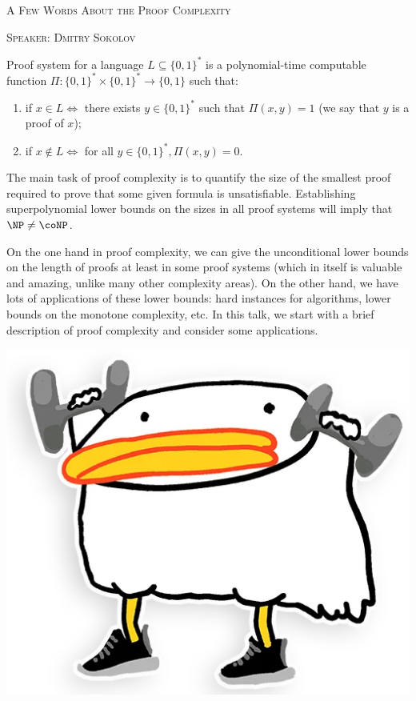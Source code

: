 \begin{center}
    \textsc{A Few Words About the Proof Complexity}

    \textsc{Speaker: Dmitry Sokolov}
\end{center}

Proof system for a language $L \subseteq \{0, 1\}^*$ is a polynomial-time computable function
$\Pi\colon \{0, 1\}^* \times \{0, 1\}^* \rightarrow \{0, 1\}$ such that: 
\begin{enumerate}
	\item if $x \in L \Leftrightarrow$ there exists $y \in \{0, 1\}^*$ such that $\Pi(x, y) = 1$ (we say
        that $y$ is a proof of $x$);
	\item if $x \notin L \Leftrightarrow$ for all $y \in \{0, 1\}^*, \Pi(x, y) = 0$.
\end{enumerate}


The main task of proof complexity is to quantify the size of the smallest proof required to prove that
some given formula is unsatisfiable. Establishing superpolynomial lower bounds on the sizes in all proof
systems will imply that $\NP \neq \coNP$.

On the one hand in proof complexity, we can give the unconditional lower bounds on the length of proofs at
least in some proof systems (which in itself is valuable and amazing, unlike many other complexity
areas). On the other hand, we have lots of applications of these lower bounds: hard instances for
algorithms, lower bounds on the monotone complexity, etc. In this talk, we start with a brief description
of proof complexity and consider some applications.

\begin{center}
    \includegraphics[scale = 0.1]{pics/utia-lift.png}
\end{center}
